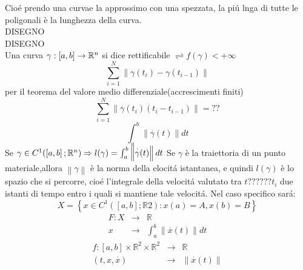 Cio\'e prendo una curvae la approssimo con una spezzata, la pi\'u lnga di tutte le poligonali è la lunghezza della curva.\\
DISEGNO\\
DISEGNO\\
Una curva $\gamma:\left[a,b\right]\to\mathbb{R}^n$ si dice rettificabile $\rightleftharpoons f(\gamma)<+\infty$
\observation
$$\sum\limits_{i=1}^{N}\left\| \gamma(t_i)-\gamma(t_{i-1}) \right\| $$
per il teorema del valore medio differenziale(accrescimenti finiti)
$$\sum\limits_{i=1}^{N}\left\| \overset{\cdot}{\gamma}(t_i)(t_i-t_{i-1})\right\| =??$$
$$\int_{a}^{b}\left\| \overset{\cdot}{\gamma}(t) \right\| dt$$
\proposition
Se $\gamma\in C^1(\left[a,b\right];\mathbb{R}^n)\Rightarrow l(\gamma)=\int_a^b\left\|\overset{\cdot}{\gamma}(t)\right\|dt$
\observation
Se $\gamma$ è la traiettoria di un punto materiale,allora $\left\|\gamma\right\|$ è la norma della elocit\'a istantanea, e quindi $l(\gamma)$ è lo spazio che si percorre, cio\'e l'integrale della velocit\'a valutato tra $t??????t_i$ due istanti di tempo entro i quali si mantiene tale velocit\'a.
\observation
Nel caso specifico sar\'a:
$$ X=\left\{ x\in C^1(\left[a,b\right];\mathbb{R}2): x(a)=A, x(b)=B \right\} $$
$$\begin{array}{ccc} 
F: X & \to & \mathbb{R} \\
x & \to & \int_{a}^b \left\|\overset{\cdot}{x}(t)\right\|dt
\end{array}$$
$$\begin{array}{ccc} 
f: \left[a,b\right]\times\mathbb{R}^2\times\mathbb{R}^2 & \to & \mathbb{R} \\
(t,x,\overset{\cdot}{x}) & \to &  \left\|\overset{\cdot}{x}(t)\right\|
\end{array}$$
